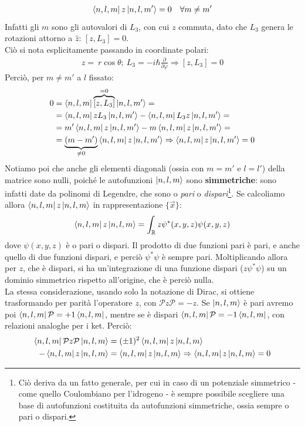\documentclass[../../FisicaTeorica.tex]{subfiles}
\begin{document}
\begin{align*}
\Bra{n,l,m}z \Ket{n,l,m'} = 0 \quad \forall m\neq m'
\end{align*}
Infatti gli $m$ sono gli autovalori di $L_3$, con cui $z$ commuta, dato che $L_3$ genera le rotazioni attorno a $\hat{z}$: $[z, L_3]=0$.\\
Ciò si nota esplicitamente passando in coordinate polari:
\begin{align*}
z =\ r\cos\theta; \> L_3=-i\hbar \frac{\partial}{\partial \varphi} \Rightarrow [z,L_3]=0
\end{align*}
Perciò, per $m\neq m'$ a $l$ fissato:
\begin{align*}
0 &= \Bra{n,l,m} \overbrace{[z,L_3]}^{=0} \Ket{n,l,m'} =\\
&= \Bra{n,l,m} zL_3 \Ket{n,l,m'} - \Bra{n,l,m}L_3z \Ket{n,l,m'}=\\
&=m' \Bra{n,l,m}z \Ket{n,l,m'} - m\Bra{n,l,m}z \Ket{n,l,m'}=\\
&= \underbrace{(m-m')}_{\neq 0} \Bra{n,l,m}z \Ket{n,l,m'} \Rightarrow \Bra{n,l,m}z \Ket{n,l,m'} = 0
\end{align*}
Notiamo poi che anche gli elementi diagonali (ossia con $m=m'$ e $l=l'$) della matrice sono nulli, poiché le autofunzioni $\Ket{n,l,m}$ sono \textbf{simmetriche}: sono infatti date da polinomi di Legendre, che sono o \textit{pari} o \textit{dispari}\footnote{Ciò deriva da un fatto generale, per cui in caso di un potenziale simmetrico - come quello Coulombiano per l'idrogeno - è sempre possibile scegliere una base di autofunzioni costituita da autofunzioni simmetriche, ossia sempre o pari o dispari.}. Se calcoliamo allora $\Bra{n,l,m}z\Ket{n,l,m}$ in rappresentazione $\{\vec{x}\}$:
\begin{align*}
\Bra{n,l,m}z\Ket{n,l,m} = \int_{\mathbb{R}}z\psi^*(x,y,z)\psi(x,y,z)
\end{align*}
dove $\psi(x,y,z)$ è o pari o dispari. Il prodotto di due funzioni pari è pari, e anche quello di due funzioni dispari, e perciò $\psi^*\psi$ è sempre pari. Moltiplicando allora per $z$, che è dispari, si ha un'integrazione di una funzione dispari ($z\psi^*\psi$) su un dominio simmetrico rispetto all'origine, che è perciò nulla.\\
La stessa considerazione, usando solo la notazione di Dirac, si ottiene trasformando per parità l'operatore $z$, con $\mathcal{P}z\mathcal{P}=-z$. Se $\Ket{n,l,m}$ è pari avremo poi $\Bra{n,l,m}\mathcal{P}=+1\Bra{n,l,m}$, mentre se è dispari $\Bra{n,l,m}\mathcal{P}=-1\Bra{n,l,m}$, con relazioni analoghe per i ket. Perciò:
\begin{align*}
\Bra{n,l,m}\mathcal{P}z\mathcal{P} \Ket{n,l,m} &= (\pm 1)^2 \Bra{n,l,m}z \Ket{n,l,m}\\
-\Bra{n,l,m}z\Ket{n,l,m} &= \Bra{n,l,m}z\Ket{n,l,m}\Rightarrow \Bra{n,l,m}z\Ket{n,l,m} =0
\end{align*}
\end{document}
